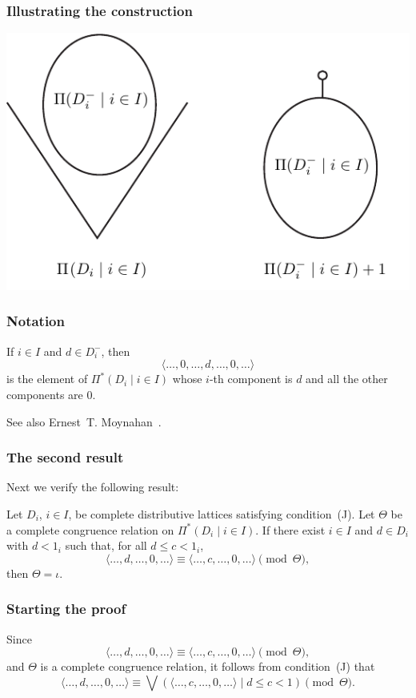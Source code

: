 \documentclass{beamer}
\begin{document}
\begin{frame}
\frametitle{Illustrating the construction}

\centering\includegraphics{products}
\end{frame}

\begin{frame}
\frametitle{Notation}

If $i \in I$ and $d \in D_{i}^{-}$, then
\[
  \langle \ldots, 0, \ldots, d, \ldots, 0, \ldots \rangle
\]
is the element of $\Pi^{*} ( D_{i} \mid i \in I )$ whose 
$i$-th component is $d$ and all the other components 
are $0$.

See also Ernest~T. Moynahan~\cite{eM57a}.
\end{frame}

\begin{frame}
\frametitle{The second result}

Next we verify the following result:

\begin{theorem}\label{T:P*} 
Let $D_{i}$, $i \in I$, be complete distributive 
lattices satisfying condition~\textup{(J)}.  
Let $\Theta$ be a complete congruence relation on 
$\Pi^{*} ( D_{i} \mid i \in I )$. 
If there exist $i \in I$ and $d \in D_{i}$ with 
$d < 1_{i}$ such that, for all $d \leq c < 1_{i}$, 
\begin{equation}\label{E:cong1} 
   \langle \ldots, d, \ldots, 0, \ldots \rangle \equiv 
   \langle \ldots, c, \ldots, 0, \ldots \rangle 
   \pmod{\Theta}, 
\end{equation}
then $\Theta = \iota$.
\end{theorem}
\end{frame}

\begin{frame}
\frametitle{Starting the proof}

Since 
\begin{equation}\label{E:cong2}
\langle \ldots, d, \ldots, 0, \ldots \rangle \equiv 
\langle \ldots, c, \ldots, 0, \ldots \rangle 
\pmod{\Theta}, 
\end{equation}
and $\Theta$ is a complete congruence relation, 
it follows from condition~(J) that
\begin{equation}\label{E:cong}
 \langle \ldots, d, \ldots, 0, \ldots \rangle \equiv
 \bigvee ( \langle \ldots, c, \ldots, 0, \ldots \rangle 
 \mid d \leq c < 1 ) \pmod{\Theta}. 
\end{equation}
\end{frame}
\end{document}
